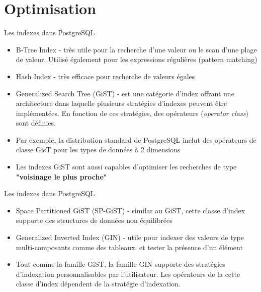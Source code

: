 
\section{Optimisation}


\begin{frame}[fragile]{Les indexes dans PostgreSQL}


   \begin{itemize}
      \item B-Tree Index - très utile pour la recherche d'une valeur ou le scan d'une plage de valeur. Utilisé également pour les expressions régulières (pattern matching)
      \item Hash Index - très efficace pour recherche de valeurs égales
      \item Generalized Search Tree (GiST) - est une catégorie d'index offrant une architecture dans laquelle plusieurs stratégies d'indexes peuvent être implémentées. En fonction de ces stratégies, des opérateurs (\textit{operator class}) sont définies.
      \item Par exemple, la distribution standard de PostgreSQL inclut des opérateurs de classe GisT pour les types de données à 2 dimensions
      \item Les indexes GiST sont aussi capables d'optimiser les recherches de type \textbf{"voisinage le plus proche"}
   \end{itemize}

\begin{toile}
\end{toile}

\end{frame}


\begin{frame}[fragile]{Les indexes dans PostgreSQL}


   \begin{itemize}
      \item Space Partitioned GiST (SP-GiST) - similar au GiST, cette classe d'index supporte des structures de données non équilibrées
      \item Generalized Inverted Index (GIN) - utile pour indexer des valeurs de type multi-composants comme des tableaux. et tester la présence d'un élément
      \item Tout comme la famille GiST, la famille GIN supporte des stratégies d'indexation personnalisables par l'utilisateur. Les opérateurs de la cette classe d'index dépendent de la stratégie d'indexation.
   \end{itemize}

\end{frame}

